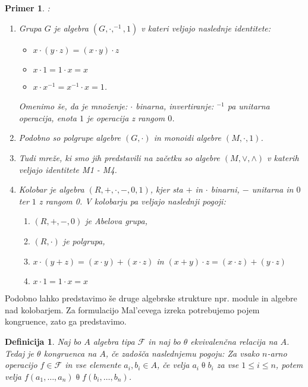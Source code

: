 \documentclass[a4paper,11pt]{article}
\newtheorem{definicija}{Definicija}
\newtheorem{primer}{Primer}
\begin{document}
\begin{primer}:
\begin{enumerate}
    \item Grupa $G$ je algebra $\left(G, \cdot, ^{-1}, 1\right)$ v kateri veljajo naslednje identitete:
    \begin{itemize}
        \item[G1] $x \cdot \left(y \cdot z\right) = \left(x \cdot y\right) \cdot z$
        \item[G2] $x \cdot 1 = 1 \cdot x = x$
        \item[G3] $x \cdot x^{-1} = x^{-1} \cdot x = 1$.
    \end{itemize} 
    Omenimo še, da je množenje: $\cdot$ binarna, invertiranje: $^{-1}$ pa unitarna operacija, enota $1$ je operacija 
    z rangom $0$. 
    \item Podobno so polgrupe algebre $\left(G, \cdot\right)$ in monoidi algebre  $\left(M, \cdot, 1\right)$.
    \item Tudi mreže, ki smo jih predstavili na začetku so algebre $\left(M,\vee, \wedge\right)$ v katerih veljajo
    identitete M1 - M4. 
    \item Kolobar je algebra $\left(R, +, \cdot, -, 0, 1\right)$, kjer sta $+$ in $\cdot$ binarni, $-$ unitarna in $0$ 
    ter $1$ z rangom 0. V kolobarju pa veljajo naslednji pogoji:
    \begin{enumerate}
        \item[R1] $\left(R, +, -, 0\right)$ je Abelova grupa,
        \item[R2] $\left(R, \cdot\right)$ je polgrupa, 
        \item[R3] $x \cdot \left(y + z\right) = \left(x \cdot y\right) + \left(x \cdot z\right)$ in
        $\left(x + y\right) \cdot z = \left(x \cdot z\right) + \left(y \cdot z\right)$
        \item[G2] $x \cdot 1 = 1 \cdot x = x$
    \end{enumerate}
\end{enumerate}
\end{primer}
Podobno lahko predstavimo še druge algebrske strukture npr. module in algebre nad kolobarjem.
Za formulacijo Mal'cevega izreka potrebujemo pojem kongruence, zato ga predstavimo.

\begin{definicija}
    Naj bo $A$ algebra tipa $\mathcal{F}$ in naj bo $\theta$ ekvivalenčna relacija na $A$. Tedaj je $\theta$ 
    \emph{kongruenca} na $A$, če zadošča naslednjemu pogoju: Za vsako $n$-arno operacijo $f \in \mathcal{F}$ in 
    vse elemente $a_i, b_i \in A$, če velja $a_i \mathrel{\theta} b_i$ za vse $1 \leq i \leq n$, potem velja $f \left(a_1, 
    \dots, a_n\right) \mathrel{\theta} f\left(b_i, \dots, b_n\right)$.
\end{definicija}
\end{document}
